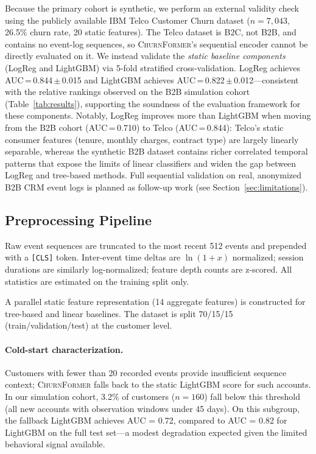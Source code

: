 \documentclass[review, 12pt]{elsarticle}
\newcommand{\model}{\textsc{ChurnFormer}}
\begin{document}
Because the primary cohort is synthetic, we perform an external validity
check using the publicly available IBM Telco Customer Churn dataset
\cite{ibm_telco2019} ($n = 7{,}043$, 26.5\% churn rate, 20 static features).
The Telco dataset is B2C, not B2B, and contains no event-log sequences, so
\model{}'s sequential encoder cannot be directly evaluated on it.
We instead validate the \emph{static baseline components} (LogReg and LightGBM)
via 5-fold stratified cross-validation.
LogReg achieves AUC\,=\,0.844\,$\pm$\,0.015 and LightGBM achieves
AUC\,=\,0.822\,$\pm$\,0.012---consistent with the relative rankings observed
on the B2B simulation cohort (Table~\ref{tab:results}), supporting the
soundness of the evaluation framework for these components.
Notably, LogReg improves more than LightGBM when moving from the B2B cohort
(AUC\,=\,0.710) to Telco (AUC\,=\,0.844): Telco's static consumer features
(tenure, monthly charges, contract type) are largely linearly separable,
whereas the synthetic B2B dataset contains richer correlated temporal patterns
that expose the limits of linear classifiers and widen the gap between
LogReg and tree-based methods.
Full sequential validation on real, anonymized B2B CRM event logs is planned
as follow-up work (see Section~\ref{sec:limitations}).

\subsection{Preprocessing Pipeline}

Raw event sequences are truncated to the most recent 512 events and prepended
with a \texttt{[CLS]} token.
Inter-event time deltas are $\ln(1 + x)$ normalized; session durations are
similarly log-normalized; feature depth counts are z-scored.
All statistics are estimated on the training split only.

A parallel static feature representation (14 aggregate features) is
constructed for tree-based and linear baselines.
The dataset is split 70/15/15 (train/validation/test) at the customer level.

\paragraph{Cold-start characterization.}
Customers with fewer than 20 recorded events provide insufficient sequence
context; \model{} falls back to the static LightGBM score for such accounts.
In our simulation cohort, 3.2\% of customers ($n = 160$) fall below this
threshold (all new accounts with observation windows under 45 days).
On this subgroup, the fallback LightGBM achieves AUC = 0.72, compared to
AUC = 0.82 for LightGBM on the full test set---a modest degradation expected
given the limited behavioral signal available.
\end{document}
